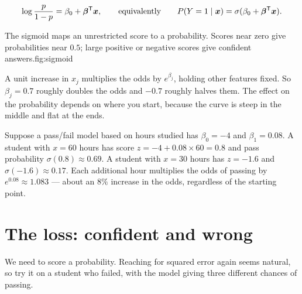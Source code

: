 \[
  \log\frac{p}{1-p}
  =\beta_0+\bm{\beta}^{\mathsf T}\bm{x},
  \qquad\text{equivalently}\qquad
  P(Y=1\mathrel{|}\bm{x})=\sigma(\beta_0+\bm{\beta}^{\mathsf T}\bm{x}).
\]

\begin{utpfig}{The sigmoid maps an unrestricted score to a probability. Scores near zero give probabilities near $0.5$; large positive or negative scores give confident answers.}{fig:sigmoid}
\end{utpfig}

A unit increase in $x_j$ multiplies the odds by $e^{\beta_j}$, holding other features fixed. So $\beta_j=0.7$ roughly doubles the odds and $-0.7$ roughly halves them. The effect on the probability depends on where you start, because the curve is steep in the middle and flat at the ends.

\begin{workedexample}
Suppose a pass/fail model based on hours studied has $\beta_0=-4$ and $\beta_1=0.08$.
A student with $x=60$ hours has score $z=-4+0.08\times 60=0.8$ and pass probability $\sigma(0.8)\approx 0.69$.
A student with $x=30$ hours has $z=-1.6$ and $\sigma(-1.6)\approx 0.17$.
Each additional hour multiplies the odds of passing by $e^{0.08}\approx 1.083$ --- about an $8\%$ increase in the odds, regardless of the starting point.
\end{workedexample}

\section{The loss: confident and wrong}

We need to score a probability. Reaching for squared error again seems natural, so try it on a student who failed, with the model giving three different chances of passing.

